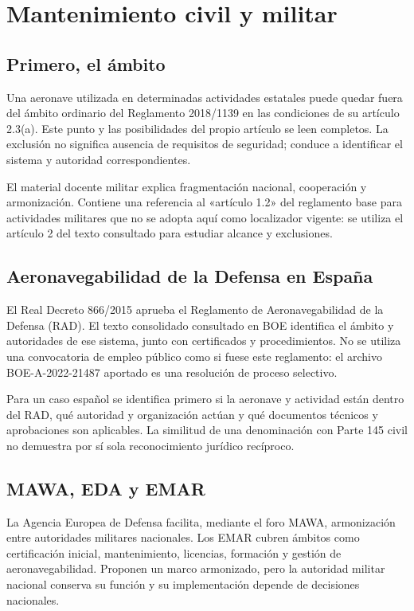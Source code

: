 \chapter{Mantenimiento civil y militar}\label{ch:23}
\section{Primero, el ámbito}
Una aeronave utilizada en determinadas actividades estatales puede quedar fuera del ámbito ordinario del Reglamento 2018/1139 en las condiciones de su artículo 2.3(a). Este punto y las posibilidades del propio artículo se leen completos. La exclusión no significa ausencia de requisitos de seguridad; conduce a identificar el sistema y autoridad correspondientes.

El material docente militar explica fragmentación nacional, cooperación y armonización. Contiene una referencia al «artículo 1.2» del reglamento base para actividades militares que no se adopta aquí como localizador vigente: se utiliza el artículo 2 del texto consultado para estudiar alcance y exclusiones.
\section{Aeronavegabilidad de la Defensa en España}
El Real Decreto 866/2015 aprueba el Reglamento de Aeronavegabilidad de la Defensa (RAD). El texto consolidado consultado en BOE identifica el ámbito y autoridades de ese sistema, junto con certificados y procedimientos. No se utiliza una convocatoria de empleo público como si fuese este reglamento: el archivo BOE-A-2022-21487 aportado es una resolución de proceso selectivo.

Para un caso español se identifica primero si la aeronave y actividad están dentro del RAD, qué autoridad y organización actúan y qué documentos técnicos y aprobaciones son aplicables. La similitud de una denominación con Parte 145 civil no demuestra por sí sola reconocimiento jurídico recíproco.
\section{MAWA, EDA y EMAR}
La Agencia Europea de Defensa facilita, mediante el foro MAWA, armonización entre autoridades militares nacionales. Los EMAR cubren ámbitos como certificación inicial, mantenimiento, licencias, formación y gestión de aeronavegabilidad. Proponen un marco armonizado, pero la autoridad militar nacional conserva su función y su implementación depende de decisiones nacionales.

